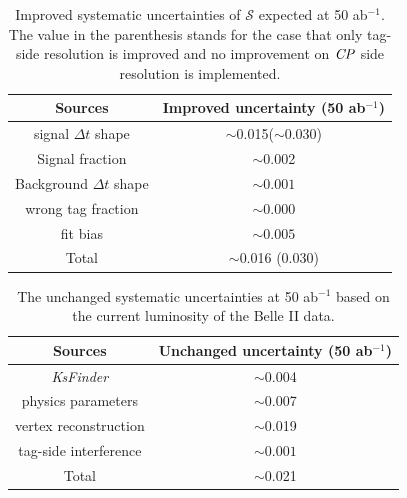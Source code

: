 \begin{table}[htpb]
	\centering
	\caption{ Improved systematic uncertainties of $\mathcal{S}$ expected at 50 ab$^{-1}$. The value in the parenthesis stands for the case that only tag-side resolution is improved and no improvement on $\it{CP}$ side resolution is implemented. }
	\label{tab:reducedsys}
	\begin{tabular}{c| c}
		\hline
		Sources & Improved uncertainty (50 ab$^{-1}$) \\
		\hline
		signal $\Delta t$ shape &  $\sim$0.015($\sim$0.030)\\
		Signal fraction &  $\sim$0.002 \\
		Background $\Delta t$ shape &  $\sim0.001$\\
		wrong tag fraction &  $\sim0.000$\\
		fit bias &  $\sim0.005$\\
		\hline
		Total & $\sim$0.016 (0.030)\\
		\hline
	\end{tabular}
\end{table}

\begin{table}[htpb]
	\centering
	\caption{The unchanged systematic uncertainties at 50 ab$^{-1}$ based on the current luminosity of the Belle II data.}
	\label{tab:unchangedsys}
	\begin{tabular}{c| c}
		\hline
		Sources & Unchanged uncertainty (50 ab$^{-1}$) \\
		\hline
		\textit{KsFinder} & $\sim$0.004\\
		physics parameters &  $\sim$0.007 \\
		vertex reconstruction &  $\sim$0.019\\
		tag-side interference &  $\sim0.001$\\
		\hline
		Total & $\sim$0.021\\
		\hline
	\end{tabular}
\end{table}

